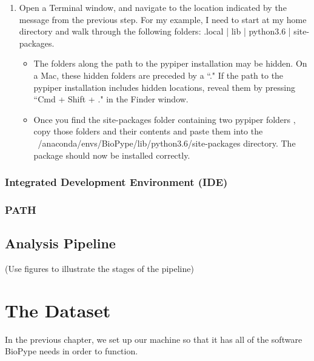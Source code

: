 \begin{enumerate}
\begin{enumerate}
            \item Open a Terminal window, and navigate to the location indicated by the message from the previous step. For my example, I need to start at my home directory and walk through the following folders: .local | lib | python3.6 | site-packages. 
            \begin{itemize}
                \item The folders along the path to the pypiper installation may be hidden. On a Mac, these hidden folders are preceded by a ``." If the path to the pypiper installation includes hidden locations, reveal them by pressing ``Cmd + Shift + ." in the Finder window.
            \item Once you find the site-packages folder containing two pypiper folders , copy those folders and their contents and paste them into the ~/anaconda/envs/BioPype/lib/python3.6/site-packages directory. The package should now be installed correctly.  
            \marginlabel{}
            \end{itemize}
        \end{enumerate}    
    \end{enumerate}

\subsection{Integrated Development Environment (IDE)}
%
\subsection{PATH}
\section{Analysis Pipeline}
(Use figures to illustrate the stages of the pipeline)

\chapter{The Dataset}

In the previous chapter, we set up our machine so that it has all of the software BioPype needs in order to function.


